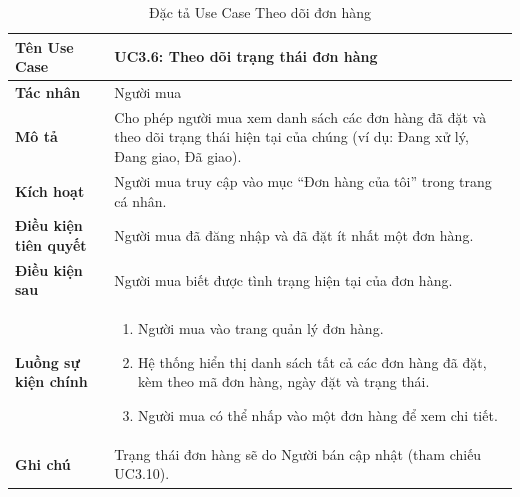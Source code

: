 \begin{table}[H]
\centering
\begin{tabularx}{\textwidth}{|l|X|}
\hline
\textbf{Tên Use Case} & \textbf{UC3.6: Theo dõi trạng thái đơn hàng} \\ \hline
\textbf{Tác nhân} & Người mua \\ \hline
\textbf{Mô tả} & Cho phép người mua xem danh sách các đơn hàng đã đặt và theo dõi trạng thái hiện tại của chúng (ví dụ: Đang xử lý, Đang giao, Đã giao). \\ \hline
\textbf{Kích hoạt} & Người mua truy cập vào mục ``Đơn hàng của tôi'' trong trang cá nhân. \\ \hline
\textbf{Điều kiện tiên quyết} & Người mua đã đăng nhập và đã đặt ít nhất một đơn hàng. \\ \hline
\textbf{Điều kiện sau} & Người mua biết được tình trạng hiện tại của đơn hàng. \\ \hline
\textbf{Luồng sự kiện chính} & 
\begin{enumerate}
    \item Người mua vào trang quản lý đơn hàng.
    \item Hệ thống hiển thị danh sách tất cả các đơn hàng đã đặt, kèm theo mã đơn hàng, ngày đặt và trạng thái.
    \item Người mua có thể nhấp vào một đơn hàng để xem chi tiết.
\end{enumerate} \\ \hline
\textbf{Ghi chú} & Trạng thái đơn hàng sẽ do Người bán cập nhật (tham chiếu UC3.10). \\ \hline
\end{tabularx}
\caption{Đặc tả Use Case Theo dõi đơn hàng}
\end{table}

